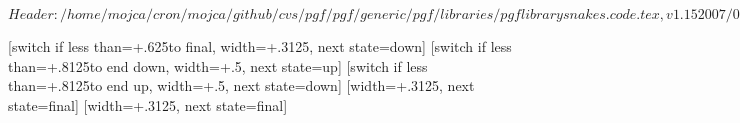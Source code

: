 %
%
%

\ProvidesFileRCS[v\pgfversion] $Header: /home/mojca/cron/mojca/github/cvs/pgf/pgf/generic/pgf/libraries/pgflibrarysnakes.code.tex,v 1.15 2007/03/09 17:49:32 tantau Exp $


\newdimen\pgfsnakesegmentamplitude
\newdimen\pgfsnakesegmentlength
\def\pgfsnakesegmentangle{45}
\def\pgfsnakesegmentobjectlength{\pgfsnakesegmentamplitude}
\def\pgfsnakesegmentaspect{0.5}

\pgfsnakesegmentlength=10pt
\pgfsnakesegmentamplitude=2.5pt



%
%

{
  [switch if less than=+.625\pgfsnakesegmentlength to final,
                  width=+.3125\pgfsnakesegmentlength,
                  next state=down]
  { 
    \pgfpathcurveto
    {\pgfqpoint{.125\pgfsnakesegmentlength}{0pt}}
    {\pgfqpoint{.1875\pgfsnakesegmentlength}{\pgfsnakesegmentamplitude}}
    {\pgfqpoint{.3125\pgfsnakesegmentlength}{\pgfsnakesegmentamplitude}}
  }
  [switch if less than=+.8125\pgfsnakesegmentlength to end down,
               width=+.5\pgfsnakesegmentlength,
               next state=up]
  {
    \pgfpathcosine{\pgfqpoint{.25\pgfsnakesegmentlength}{-1\pgfsnakesegmentamplitude}}
    \pgfpathsine{\pgfqpoint{.25\pgfsnakesegmentlength}{-1\pgfsnakesegmentamplitude}}
  }               
  [switch if less than=+.8125\pgfsnakesegmentlength to end up,
             width=+.5\pgfsnakesegmentlength,
             next state=down]
  {
    \pgfpathcosine{\pgfqpoint{.25\pgfsnakesegmentlength}{\pgfsnakesegmentamplitude}}
    \pgfpathsine{\pgfqpoint{.25\pgfsnakesegmentlength}{\pgfsnakesegmentamplitude}}
  }               
  [width=+.3125\pgfsnakesegmentlength,
                   next state=final]
  {
    \pgfpathcurveto
    {\pgfqpoint{.125\pgfsnakesegmentlength}{\pgfsnakesegmentamplitude}}
    {\pgfqpoint{.1875\pgfsnakesegmentlength}{0pt}}
    {\pgfqpoint{.3125\pgfsnakesegmentlength}{0pt}}
  }  
  [width=+.3125\pgfsnakesegmentlength,
                 next state=final]
  {
    \pgfpathcurveto
    {\pgfqpoint{.125\pgfsnakesegmentlength}{-\pgfsnakesegmentamplitude}}
    {\pgfqpoint{.1875\pgfsnakesegmentlength}{0pt}}
    {\pgfqpoint{.3125\pgfsnakesegmentlength}{0pt}}
  }  
  { \pgfpathlineto{\pgfqpoint{\pgfsnakeremainingdistance}{0pt}} }
}




